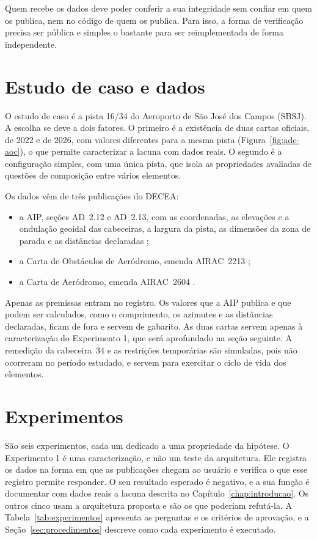 Quem recebe os dados deve poder conferir a sua integridade sem confiar em quem os publica, nem no código de quem os publica. Para isso, a forma de verificação precisa ser pública e simples o bastante para ser reimplementada de forma independente.

\section{Estudo de caso e dados}\label{sec:caso}

O estudo de caso é a pista 16/34 do Aeroporto de São José dos Campos (SBSJ). A escolha se deve a dois fatores. O primeiro é a existência de duas cartas oficiais, de 2022 e de 2026, com valores diferentes para a mesma pista (Figura~\ref{fig:adc-aoc}), o que permite caracterizar a lacuna com dados reais. O segundo é a configuração simples, com uma única pista, que isola as propriedades avaliadas de questões de composição entre vários elementos.

Os dados vêm de três publicações do DECEA:
\begin{itemize}
    \item a AIP, seções AD~2.12 e AD~2.13, com as coordenadas, as elevações e a ondulação geoidal das cabeceiras, a largura da pista, as dimensões da zona de parada e as distâncias declaradas \cite{decea2026aip};
    \item a Carta de Obstáculos de Aeródromo, emenda AIRAC~2213 \cite{decea2022aoc};
    \item a Carta de Aeródromo, emenda AIRAC~2604 \cite{decea2026adc}.
\end{itemize}

Apenas as premissas entram no registro. Os valores que a AIP publica e que podem ser calculados, como o comprimento, os azimutes e as distâncias declaradas, ficam de fora e servem de gabarito. As duas cartas servem apenas à caracterização do Experimento 1, que será aprofundado na seção seguinte. A remedição da cabeceira~34 e as restrições temporárias são simuladas, pois não ocorreram no período estudado, e servem para exercitar o ciclo de vida dos elementos.

\section{Experimentos}\label{sec:experimentos}

São seis experimentos, cada um dedicado a uma propriedade da hipótese. O Experimento 1 é uma caracterização, e não um teste da arquitetura. Ele registra os dados na forma em que as publicações chegam ao usuário e verifica o que esse registro permite responder. O seu resultado esperado é negativo, e a sua função é documentar com dados reais a lacuna descrita no Capítulo~\ref{chap:introducao}. Os outros cinco usam a arquitetura proposta e são os que poderiam refutá-la. A Tabela~\ref{tab:experimentos} apresenta as perguntas e os critérios de aprovação, e a Seção~\ref{sec:procedimentos} descreve como cada experimento é executado.


